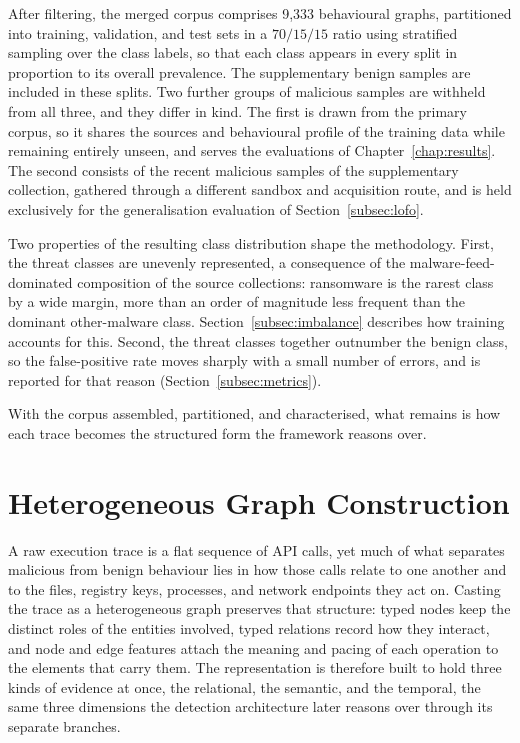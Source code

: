 \documentclass[%
    BCOR=10mm,
    DIV=13,
    toc=bibliography,
    toc=listof,
    oneside,
    12pt,
]{scrbook}
\begin{document}
After filtering, the merged corpus comprises 9{,}333 behavioural graphs,
partitioned into training, validation, and test sets in a $70/15/15$ ratio
using stratified sampling over the class labels, so that each class appears in
every split in proportion to its overall prevalence. The supplementary benign
samples are included in these splits. Two further groups of malicious samples
are withheld from all three, and they differ in kind. The first is drawn from
the primary corpus, so it shares the sources and behavioural profile of the
training data while remaining entirely unseen, and serves the evaluations of
Chapter~\ref{chap:results}. The second consists
of the recent malicious samples of the supplementary collection, gathered
through a different sandbox and acquisition route, and is held exclusively for
the generalisation evaluation of Section~\ref{subsec:lofo}.

Two properties of the resulting class distribution shape the methodology.
First, the threat classes are unevenly represented, a consequence of the
malware-feed-dominated composition of the source collections: ransomware is the
rarest class by a wide margin, more than an order of magnitude less frequent
than the dominant other-malware class. Section~\ref{subsec:imbalance}
describes how training accounts for this.
Second, the threat classes together outnumber the benign class, so the
false-positive rate moves sharply with a small number of errors, and is
reported for that reason (Section~\ref{subsec:metrics}).

With the corpus assembled, partitioned, and characterised, what remains is how
each trace becomes the structured form the framework reasons over.

\section{Heterogeneous Graph Construction}
\label{sec:graph_construction}

A raw execution trace is a flat sequence of API calls, yet much of what
separates malicious from benign behaviour lies in how those calls relate to
one another and to the files, registry keys, processes, and network endpoints
they act on. Casting the trace as a heterogeneous graph preserves that
structure: typed nodes keep the distinct roles of the entities involved, typed
relations record how they interact, and node and edge features attach the
meaning and pacing of each operation to the elements that carry them. The
representation is therefore built to hold three kinds of evidence at once, the
relational, the semantic, and the temporal, the same three dimensions the
detection architecture later reasons over through its separate branches.
\end{document}
